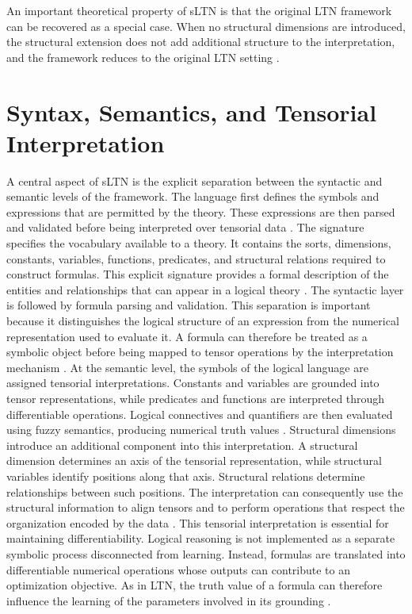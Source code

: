 An important theoretical property of sLTN is that the original LTN framework can be recovered as a special case. When no structural dimensions are introduced, the structural extension does not add additional structure to the interpretation, and the framework reduces to the original LTN setting \cite{rinaldi2026sltn}.

\section{Syntax, Semantics, and Tensorial Interpretation}

\noindent
A central aspect of sLTN is the explicit separation between the syntactic and semantic levels of the framework. The language first defines the symbols and expressions that are permitted by the theory. These expressions are then parsed and validated before being interpreted over tensorial data \cite{rinaldi2026sltn}.
The signature specifies the vocabulary available to a theory. It contains the sorts, dimensions, constants, variables, functions, predicates, and structural relations required to construct formulas. This explicit signature provides a formal description of the entities and relationships that can appear in a logical theory \cite{rinaldi2026sltn}.
The syntactic layer is followed by formula parsing and validation. This separation is important because it distinguishes the logical structure of an expression from the numerical representation used to evaluate it. A formula can therefore be treated as a symbolic object before being mapped to tensor operations by the interpretation mechanism \cite{rinaldi2026sltn}.
At the semantic level, the symbols of the logical language are assigned tensorial interpretations. Constants and variables are grounded into tensor representations, while predicates and functions are interpreted through differentiable operations. Logical connectives and quantifiers are then evaluated using fuzzy semantics, producing numerical truth values \cite{badreddine2022logic,rinaldi2026sltn}.
Structural dimensions introduce an additional component into this interpretation. A structural dimension determines an axis of the tensorial representation, while structural variables identify positions along that axis. Structural relations determine relationships between such positions. The interpretation can consequently use the structural information to align tensors and to perform operations that respect the organization encoded by the data \cite{rinaldi2026sltn}.
This tensorial interpretation is essential for maintaining differentiability. Logical reasoning is not implemented as a separate symbolic process disconnected from learning. Instead, formulas are translated into differentiable numerical operations whose outputs can contribute to an optimization objective. As in LTN, the truth value of a formula can therefore influence the learning of the parameters involved in its grounding \cite{badreddine2022logic,rinaldi2026sltn}.
